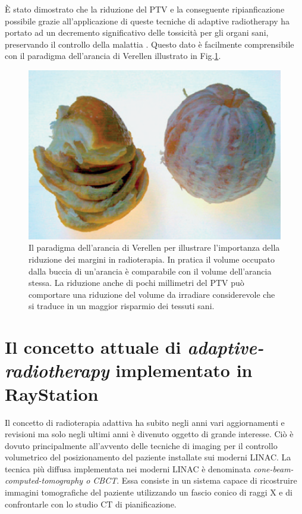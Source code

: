 \`E stato dimostrato che la riduzione del PTV e la conseguente ripianficazione possibile grazie all'applicazione di queste tecniche di adaptive radiotherapy ha portato ad un decremento significativo delle tossicità per gli organi sani, preservando il controllo della malattia \cite{Park2012}. Questo dato è facilmente comprensibile con il paradigma dell'arancia di Verellen \cite{Verellen2007} illustrato in Fig.\ref{fig:verellen}.
\begin{figure}[!t]
\centering
\includegraphics[width=.6\textwidth]{./cap3/Verellen.png}
\caption{Il paradigma dell'arancia di Verellen \cite{Verellen2007} per illustrare l'importanza della riduzione dei margini in radioterapia. In pratica il volume occupato dalla buccia di un'arancia è comparabile con il volume dell'arancia stessa. La riduzione anche di pochi millimetri del PTV può comportare una riduzione del volume da irradiare considerevole che si traduce in un maggior risparmio dei tessuti sani.}
\label{fig:verellen}
\end{figure}



\section{Il concetto attuale di \textit{adaptive-radiotherapy} implementato in RayStation}
Il concetto di radioterapia adattiva ha subito negli anni vari aggiornamenti e revisioni ma solo negli ultimi anni è divenuto oggetto di grande interesse. Ciò è dovuto principalmente all'avvento  delle tecniche di imaging per il controllo volumetrico del posizionamento del paziente installate sui moderni LINAC. La tecnica più diffusa implementata nei moderni LINAC è denominata \textit{cone-beam-computed-tomography o CBCT}. Essa consiste in un sistema capace di ricostruire immagini tomografiche del paziente utilizzando un fascio conico di raggi X e di confrontarle con lo studio CT di pianificazione.

